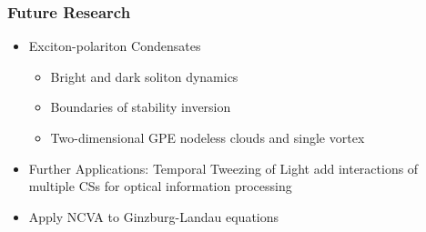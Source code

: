 \begin{frame}
\frametitle{Future Research}
\begin{block}{}
\begin{itemize}
\item Exciton-polariton Condensates
\begin{itemize}
\item  Bright and dark soliton dynamics 
\item Boundaries of \textcolor{paleblue}{stability inversion}
\item  \textcolor{paleblue}{Two-dimensional} GPE nodeless clouds and single vortex
\end{itemize}
\item Further Applications: \textcolor{paleblue} {Temporal Tweezing of Light} add interactions of multiple CSs for optical information processing
\item Apply NCVA to \textcolor{paleblue}{Ginzburg-Landau equations}
\end{itemize}
\end{block}

\end{frame}

